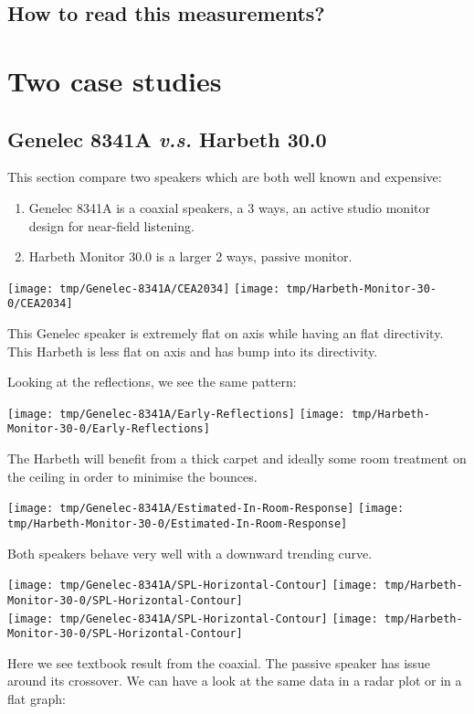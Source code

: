\documentclass{tufte-book}
\begin{document}
\section{How to read this measurements?}

\chapter{Two case studies}

\section{Genelec 8341A \emph{v.s.} Harbeth 30.0}

This section compare two speakers which are both well known and expensive:
\begin{enumerate}
\item Genelec 8341A is a coaxial speakers, a 3 ways, an active studio monitor design for near-field listening.
\item Harbeth Monitor 30.0 is a larger 2 ways, passive monitor.
\end{enumerate}

\begin{figure*}[ht]
  \texttt{[image: tmp/Genelec-8341A/CEA2034]}
  \texttt{[image: tmp/Harbeth-Monitor-30-0/CEA2034]}
\end{figure*}
This Genelec speaker is extremely flat on axis while having an flat directivity.
This Harbeth is less flat on axis and has bump into its directivity.

Looking at the reflections, we see the same pattern:
\begin{figure*}[ht]
  \texttt{[image: tmp/Genelec-8341A/Early-Reflections]}
  \texttt{[image: tmp/Harbeth-Monitor-30-0/Early-Reflections]}
\end{figure*}
The Harbeth will benefit from a thick carpet and ideally some room treatment on
the ceiling in order to minimise the bounces.

\begin{figure*}[ht]
  \texttt{[image: tmp/Genelec-8341A/Estimated-In-Room-Response]}
  \texttt{[image: tmp/Harbeth-Monitor-30-0/Estimated-In-Room-Response]}
\end{figure*}
Both speakers behave very well with a downward trending curve.

\begin{figure*}[ht]
  \texttt{[image: tmp/Genelec-8341A/SPL-Horizontal-Contour]}
  \texttt{[image: tmp/Harbeth-Monitor-30-0/SPL-Horizontal-Contour]}
  \\\vspace{\baselineskip}
  \texttt{[image: tmp/Genelec-8341A/SPL-Horizontal-Contour]}
  \texttt{[image: tmp/Harbeth-Monitor-30-0/SPL-Horizontal-Contour]}
\end{figure*}
Here we see textbook result from the coaxial. The passive speaker has issue around its crossover.
We can have a look at the same data in a radar plot or in a flat graph:
\end{document}
